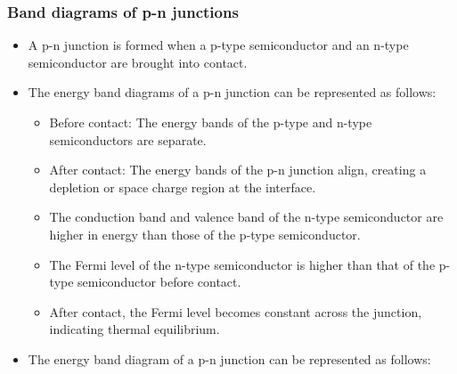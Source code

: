 \begin{frame}
    \frametitle{Band diagrams of p-n junctions}
	\begin{itemize}
		\item A p-n junction is formed when a p-type semiconductor and an n-type semiconductor are brought into contact.
		\item The energy band diagrams of a p-n junction can be represented as follows:
		\begin{itemize}
			\item Before contact: The energy bands of the p-type and n-type semiconductors are separate.
			\item After contact: The energy bands of the p-n junction align, creating a depletion or space charge region at the interface.
			\item The conduction band and valence band of the n-type semiconductor are higher in energy than those of the p-type semiconductor.
			\item The Fermi level of the n-type semiconductor is higher than that of the p-type semiconductor before contact.
			\item After contact, the Fermi level becomes constant across the junction, indicating thermal equilibrium.
		\end{itemize}
		\item The energy band diagram of a p-n junction can be represented as follows:
\end{itemize}
\end{frame}


